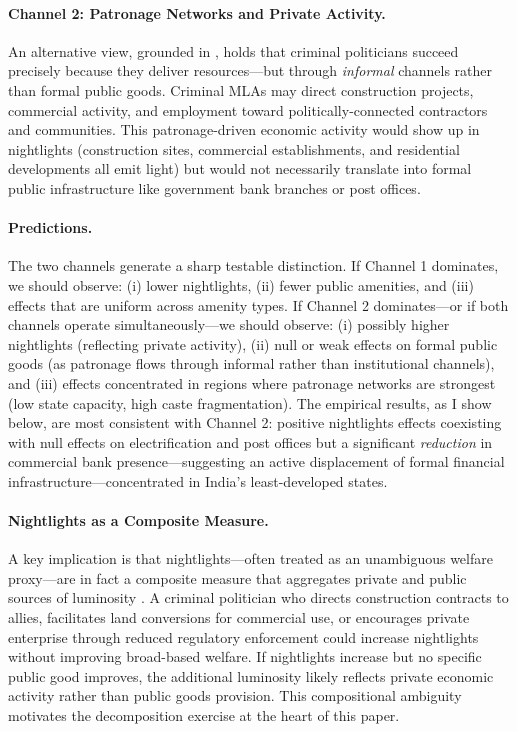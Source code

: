 \documentclass[12pt]{article}
\begin{document}
\paragraph{Channel 2: Patronage Networks and Private Activity.} An alternative view, grounded in \citet{vaishnav2017}, holds that criminal politicians succeed precisely because they deliver resources---but through \textit{informal} channels rather than formal public goods. Criminal MLAs may direct construction projects, commercial activity, and employment toward politically-connected contractors and communities. This patronage-driven economic activity would show up in nightlights (construction sites, commercial establishments, and residential developments all emit light) but would not necessarily translate into formal public infrastructure like government bank branches or post offices.

\paragraph{Predictions.} The two channels generate a sharp testable distinction. If Channel 1 dominates, we should observe: (i) lower nightlights, (ii) fewer public amenities, and (iii) effects that are uniform across amenity types. If Channel 2 dominates---or if both channels operate simultaneously---we should observe: (i) possibly higher nightlights (reflecting private activity), (ii) null or weak effects on formal public goods (as patronage flows through informal rather than institutional channels), and (iii) effects concentrated in regions where patronage networks are strongest (low state capacity, high caste fragmentation). The empirical results, as I show below, are most consistent with Channel 2: positive nightlights effects coexisting with null effects on electrification and post offices but a significant \textit{reduction} in commercial bank presence---suggesting an active displacement of formal financial infrastructure---concentrated in India's least-developed states.

\paragraph{Nightlights as a Composite Measure.} A key implication is that nightlights---often treated as an unambiguous welfare proxy---are in fact a composite measure that aggregates private and public sources of luminosity \citep{henderson2012,storeygard2016}. A criminal politician who directs construction contracts to allies, facilitates land conversions for commercial use, or encourages private enterprise through reduced regulatory enforcement could increase nightlights without improving broad-based welfare. If nightlights increase but no specific public good improves, the additional luminosity likely reflects private economic activity rather than public goods provision. This compositional ambiguity motivates the decomposition exercise at the heart of this paper.
\end{document}
